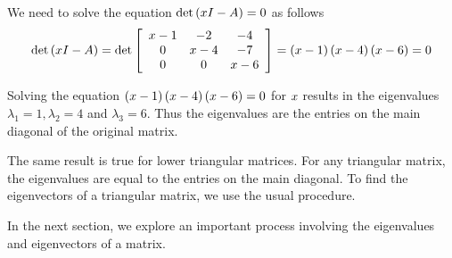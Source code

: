 \begin{solution}
We need to solve the equation $\det \left( x I - A \right) = 0$ as follows
\begin{eqnarray*}
\det \left( x I - A \right) =
\det \left[
\begin{array}{ccc}
x -1 & -2 & -4 \\
0 & x-4 & -7 \\
0 & 0 & x-6
\end{array}
\right] =\left( x-1 \right) \left( x-4 \right) \left( x-6 \right) =0
\end{eqnarray*}

Solving the equation $\left( x-1 \right) \left( x-4
\right) \left( x-6 \right) = 0$ for $x$ results in the eigenvalues 
$\lambda_1 = 1, \lambda_2 = 4$ and $\lambda_3 = 6$.  Thus the
eigenvalues are the entries on the main diagonal of the original
matrix.
\end{solution}

The same result is true for lower triangular matrices. For any triangular matrix,
the eigenvalues are equal to the entries on the main diagonal. To find the 
eigenvectors of a triangular matrix, we use the usual procedure. 

In the next section, we explore an important process involving the eigenvalues and eigenvectors of a matrix. 